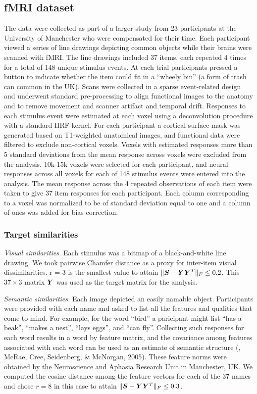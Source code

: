 \subsection{fMRI dataset} The data were collected as part of a larger study from 23
participants at the University of Manchester who were compensated for their time. Each
participant viewed a series of line drawings depicting common objects while their brains
were scanned with fMRI. The line drawings included 37 items, each repeated 4 times for a
total of 148 unique stimulus events. At each trial participants pressed a button to
indicate whether the item could fit in a ``wheely bin'' (a form of trash can common in the
UK).
Scans were collected in a sparse event-related design and underwent standard
pre-processing to align functional images to the anatomy and to remove movement and
scanner artifact and temporal drift. Responses to each stimulus event were estimated at
each voxel using a deconvolution procedure with a standard HRF kernel. For each
participant a cortical surface mask was generated based on T1-weighted anatomical images,
and functional data were filtered to exclude non-cortical voxels. Voxels with estimated
responses more than 5 standard deviations from the mean response across voxels were
excluded from the analysis. 10k-15k voxels were selected for each participant, and neural
responses across all voxels for each of 148 stimulus events were entered into the
analysis. The mean response across the 4 repeated observations of each item were taken to
give 37 item responses for each participant. Each column corresponding to a voxel was
normalized to be of standard deviation equal to one and a column of ones was added for
bias correction.

\subsubsection*{Target similarities}
\textit{Visual similarities.} Each stimulus was a bitmap of a black-and-white line
drawing. We took pairwise Chamfer distance as a proxy for inter-item visual
dissimilarities. r = 3 is the smallest value to attain $\|\boldsymbol{S} - \boldsymbol{Y}\boldsymbol{Y}^T\|_F \leq 0.2$.
This $37 \times 3$ matrix $\boldsymbol{Y}$ was used as the target matrix for the analysis.

\textit{Semantic similarities.} Each image depicted an easily namable object. Participants
were provided with each name and asked to list all the features and qualities that come to
mind. For example, for the word ``bird'' a paricipant might list ``has a beak'', ``makes a
nest'', ``lays eggs'', and ``can fly''. Collecting such responses for each word results in
a word by feature matrix, and the covariance among features associated with each word can
be used as an estimate of semantic structure (\eg, McRae, Cree, Seidenberg, \& McNorgan,
2005). These feature norms were obtained by the Neuroscience and Aphasia Research Unit in
Manchester, UK. We computed the cosine distance among the feature vectors for each of the 37 names
and chose $r = 8$ in this case to attain $\|\boldsymbol{S} - \boldsymbol{Y}\boldsymbol{Y}^T\|_F \leq 0.3$.


